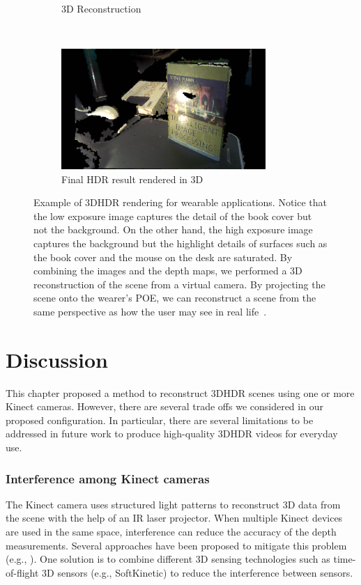 \begin{figure}[t!]
\begin{subfigure}{0.4\textwidth}
        \caption{3D Reconstruction}
        \label{hdr_result1}
    \end{subfigure}
    ~
    \begin{subfigure}{0.55\textwidth}
	\centering	
	\includegraphics[height=1.8in]{ch4/diagrams/hdr_results/hdr.jpg}
	\caption{Final HDR result rendered in 3D}
	\label{hdr_result2}
    \end{subfigure}
    
    \caption{Example of 3DHDR rendering for wearable applications. Notice that the low exposure image captures the detail of the book cover but not the background. On the other hand, the high exposure image captures the background but the highlight details of surfaces such as the book cover and the mouse on the desk are saturated. By combining the images and the depth maps, we performed a 3D reconstruction of the scene from a virtual camera. By projecting the scene onto the wearer's POE, we can reconstruct a scene from the same perspective as how the user may see in real life~\cite{lo2013three}.}
\label{fig_3D_HDR_results}
\end{figure}

\section{Discussion}
\label{sec_discussion}
This chapter proposed a method to reconstruct 3DHDR scenes using one or more Kinect cameras. However, there are several trade offs we considered in our proposed configuration. In particular, there are several limitations to be addressed in future work to produce high-quality 3DHDR videos for everyday use. 

\subsubsection{Interference among Kinect cameras}
The Kinect camera uses structured light patterns to reconstruct 3D data from the scene with the help of an IR laser projector. When multiple Kinect devices are used in the same space, interference can reduce the accuracy of the depth measurements. Several approaches have been proposed to mitigate this problem (e.g., \cite{maimone2012reducing}). One solution is to combine different 3D sensing technologies such as time-of-flight 3D sensors (e.g., SoftKinetic) to reduce the interference between sensors. 

